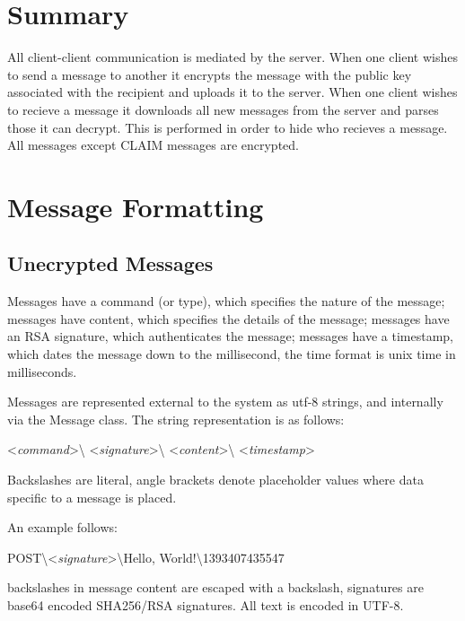 \section{Summary}
All client-client communication is mediated by the server. When one client
wishes to send a message to another it encrypts the message with the public key
associated with the recipient and uploads it to the server. When one client
wishes to recieve a message it downloads all new messages from the server and
parses those it can decrypt. This is performed in order to hide who recieves a
message. All messages except CLAIM messages are encrypted.

\section{Message Formatting}
\subsection{Unecrypted Messages}
Messages have a command (or type), which specifies the nature of the message;
messages have content, which specifies the details of the message;
messages have an RSA signature, which authenticates the message;
messages have a timestamp, which dates the message down to the millisecond, the
time format is unix time in milliseconds.

Messages are represented external to the system as utf-8 strings, and internally
via the Message class. The string representation is as follows:\\

\begin{center}
\textless \textit{command}\textgreater\textbackslash
\textless \textit{signature}\textgreater\textbackslash
\textless \textit{content}\textgreater\textbackslash
\textless \textit{timestamp}\textgreater
\end{center}

Backslashes are literal, angle brackets denote placeholder values where data
specific to a message is placed.

An example follows:
\begin{center}
POST\textbackslash\textless\textit{signature}\textgreater\textbackslash Hello, World!\textbackslash 1393407435547
\end{center}

backslashes in message content are escaped with a backslash, signatures are
base64 encoded SHA256/RSA signatures. All text is encoded in UTF-8.

